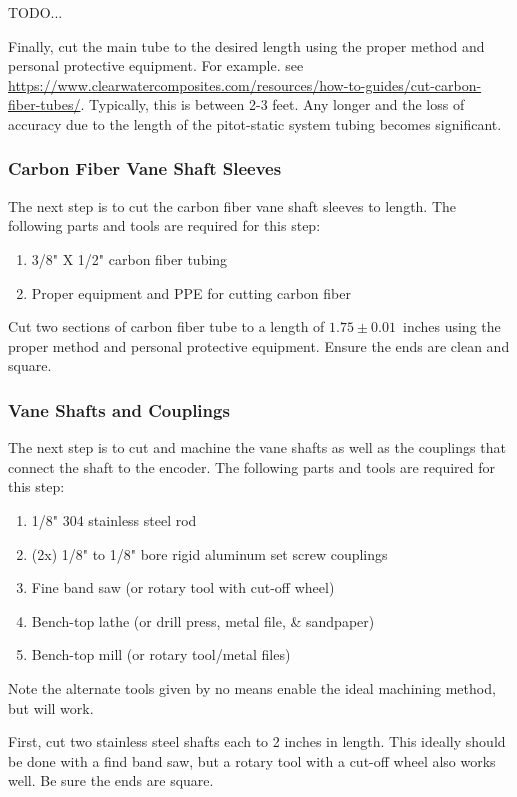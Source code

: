 \documentclass[10pt,onecolumn]{article}
\begin{document}
			TODO...
			
			Finally, cut the main tube to the desired length using the proper method and personal protective equipment. For example. see \url{https://www.clearwatercomposites.com/resources/how-to-guides/cut-carbon-fiber-tubes/}. Typically, this is between 2-3 feet. Any longer and the loss of accuracy due to the length of the pitot-static system tubing becomes significant.
			
		\subsubsection{Carbon Fiber Vane Shaft Sleeves}
			
			The next step is to cut the carbon fiber vane shaft sleeves to length. The following parts and tools are required for this step:
			\begin{enumerate}
				\item 3/8" X 1/2" carbon fiber tubing
				\item Proper equipment and PPE for cutting carbon fiber
			\end{enumerate}
			
			Cut two sections of carbon fiber tube to a length of $1.75\pm0.01$~inches using the proper method and personal protective equipment. Ensure the ends are clean and square.
		
		\subsubsection{Vane Shafts and Couplings}
		
			The next step is to cut and machine the vane shafts as well as the couplings that connect the shaft to the encoder. The following parts and tools are required for this step:
			\begin{enumerate}
				\item 1/8" 304 stainless steel rod
				\item (2x) 1/8" to 1/8" bore rigid aluminum set screw couplings
				\item Fine band saw (or rotary tool with cut-off wheel)
				\item Bench-top lathe (or drill press, metal file, \& sandpaper)
				\item Bench-top mill (or rotary tool/metal files)
			\end{enumerate}
			Note the alternate tools given by no means enable the ideal machining method, but will work.
			
			First, cut two stainless steel shafts each to 2 inches in length. This ideally should be done with a find band saw, but a rotary tool with a cut-off wheel also works well. Be sure the ends are square.
			
\end{document}
